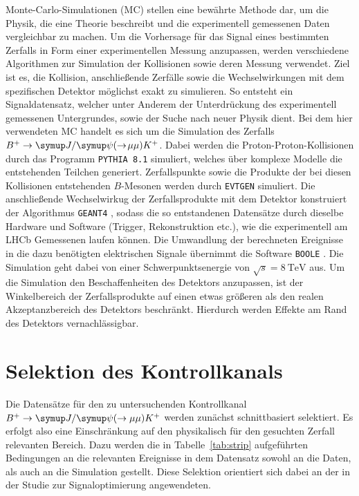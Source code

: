 Monte-Carlo-Simulationen (MC) stellen eine bewährte Methode dar, um die Physik, die eine Theorie beschreibt und die experimentell gemessenen Daten vergleichbar zu machen. Um die Vorhersage für das Signal eines bestimmten Zerfalls in Form einer experimentellen Messung anzupassen, werden verschiedene Algorithmen zur Simulation der Kollisionen sowie deren Messung verwendet. Ziel ist es, die Kollision, anschließende Zerfälle sowie die Wechselwirkungen mit dem spezifischen Detektor möglichst exakt zu simulieren. So entsteht ein Signaldatensatz, welcher unter Anderem der Unterdrückung des experimentell gemessenen Untergrundes, sowie der Suche nach neuer Physik dient. Bei dem hier verwendeten MC handelt es sich um die Simulation des Zerfalls $B^{+}\rightarrow\jpsi(\rightarrow\!\mu\mu) K^{+}$. Dabei werden die Proton-Proton-Kollisionen durch das Programm \texttt{PYTHIA 8.1} \cite{pythia} simuliert, welches über komplexe Modelle die entstehenden Teilchen generiert. Zerfallspunkte sowie die Produkte der bei diesen Kollisionen entstehenden $B$-Mesonen werden durch \texttt{EVTGEN} \cite{evtgen} simuliert. Die anschließende Wechselwirkug der Zerfallsprodukte mit dem Detektor konstruiert der Algorithmus \texttt{GEANT4}  \cite{geant4}, sodass die so entstandenen Datensätze durch dieselbe Hardware und Software (Trigger, Rekonstruktion etc.), wie die experimentell am LHCb Gemessenen laufen können. Die Umwandlung der berechneten Ereignisse in die dazu benötigten elektrischen Signale übernimmt die Software \texttt{BOOLE} \cite{boole}. Die Simulation geht dabei von einer Schwerpunktsenergie von $\sqrt{s}=\SI{8}{\tera\electronvolt}$ aus. Um die Simulation den Beschaffenheiten des Detektors anzupassen, ist der Winkelbereich der Zerfallsprodukte auf einen etwas größeren als den realen Akzeptanzbereich des Detektors beschränkt. Hierdurch werden Effekte am Rand des Detektors vernachlässigbar.
\section{Selektion des Kontrollkanals}
Die Datensätze für den zu untersuchenden Kontrollkanal $B^{+}\rightarrow\jpsi(\rightarrow\mu\mu) K^{+}$ werden zunächst schnittbasiert selektiert. Es erfolgt also eine Einschränkung auf den physikalisch für den gesuchten Zerfall relevanten Bereich. Dazu werden die in Tabelle~\ref{tab:strip} aufgeführten Bedingungen an die relevanten Ereignisse in dem Datensatz sowohl an die Daten, als auch an die Simulation gestellt. Diese Selektion orientiert sich dabei an der in der Studie zur Signaloptimierung \cite{ba-maik} angewendeten.

